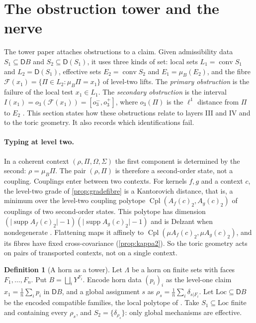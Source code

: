 \documentclass[11pt]{article}
\theoremstyle{definition}
\newtheorem{definition}[theorem]{Definition}
\theoremstyle{remark}
\newcommand{\D}{\mathsf{D}}
\newcommand{\Cpl}{\operatorname{Cpl}}
\newcommand{\supp}{\operatorname{supp}}
\begin{document}
\section{The obstruction tower and the nerve}\label{sec:towernerve}

The tower paper \cite{Awasthi-Tower} attaches obstructions to a claim. Given admissibility data $S_1\subseteq\D B$ and
$S_2\subseteq\D(S_1)$, it uses three kinds of set: local sets $L_1=\operatorname{conv}S_1$ and $L_2=\D(S_1)$, effective sets
$E_2=\operatorname{conv}S_2$ and $E_1=\mu_B(E_2)$, and the fibre $\mathcal F(x_1)=\{\Pi\in L_2:\mu_B\Pi=x_1\}$ of level-two lifts.
The \emph{primary obstruction} is the failure of the local test $x_1\in L_1$. The \emph{secondary obstruction} is the interval
$I(x_1)=o_3(\mathcal F(x_1))=[o_3^-,o_3^+]$, where $o_3(\Pi)$ is the $\ell^1$ distance from $\Pi$ to $E_2$
\cite[Def.~10.11, Def.~10.14, Prop.~10.15]{Awasthi-Tower}. This section states how these obstructions relate to layers
III and IV and to the toric geometry. It also records which identifications fail.

\paragraph{Typing at level two.} In a coherent context $(\rho,\Pi,\Omega,\Sigma)$ the first component is determined by the second:
$\rho=\mu_B\Pi$. The pair $(\rho,\Pi)$ is therefore a second-order state, not a coupling. Couplings enter between two
contexts. For kernels $f,g$ and a context $c$, the level-two grade of \cref{prop:gradefibre} is a Kantorovich distance, that is,
a minimum over the level-two coupling polytope $\Cpl(A_f(c)_2,A_g(c)_2)$ of couplings of two second-order states. This polytope
has dimension $(\lvert\supp A_f(c)_2\rvert-1)(\lvert\supp A_g(c)_2\rvert-1)$ and is Delzant when nondegenerate
\cite[Prop.~5.1]{Awasthi-Family}. Flattening maps it affinely to $\Cpl(\mu A_f(c)_2,\mu A_g(c)_2)$, and its fibres have fixed
cross-covariance (\cref{prop:kappa2}). So the toric geometry acts on pairs of transported contexts, not on a single context.

\begin{definition}[A horn as a tower]\label{def:horntower}
Let $\Lambda$ be a horn on finite sets with faces $F_1,\dots,F_n$. Put $B=\bigsqcup_iY^{F_i}$. Encode horn data
$(p_i)_i$ as the level-one claim $x_1=\frac1n\sum_i p_i$ in $\D B$, and a global assignment $s$ as $\rho_s=\frac1n\sum_i\delta_{s|F_i}$.
Let $\mathrm{Loc}\subseteq\D B$ be the encoded compatible families, the local polytope of \cite{AbramskyBrandenburger2011}. Take
$S_1\subseteq\mathrm{Loc}$ finite and containing every $\rho_s$, and $S_2=\{\delta_{\rho_s}\}$: only global mechanisms are effective.
\end{definition}
\end{document}

